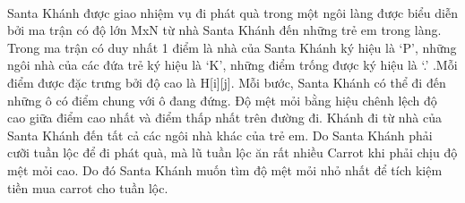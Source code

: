  

Santa Khánh được giao nhiệm vụ đi phát quà trong một ngôi làng được biểu diễn bởi ma trận có độ lớn MxN từ nhà Santa Khánh đến những trẻ em trong làng. Trong ma trận có duy nhất 1 điểm là nhà của Santa Khánh ký hiệu là ‘P’, những ngôi nhà của các đứa trẻ ký hiệu là ‘K’, những điểm trống được ký hiệu là ‘.’ .Mỗi điểm được đặc trưng bởi độ cao là H[i][j]. Mỗi bước, Santa Khánh có thể đi đến những ô có điểm chung với ô đang đứng. Độ mệt mỏi bằng hiệu chênh lệch độ cao giữa điểm cao nhất và điểm thấp nhất trên đường đi. Khánh đi từ nhà của Santa Khánh đến tất cả các ngôi nhà khác của trẻ em. Do Santa Khánh phải cưỡi tuần lộc để đi phát quà, mà lũ tuần lộc ăn rất nhiều Carrot khi phải chịu độ mệt mỏi cao. Do đó Santa Khánh muốn tìm độ mệt mỏi nhỏ nhất để tích kiệm tiền mua carrot cho tuần lộc.